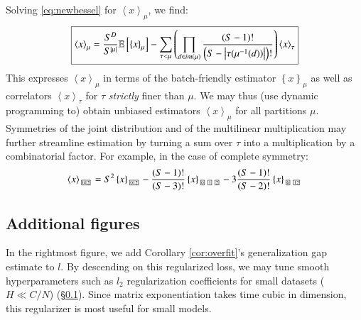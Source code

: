 \documentclass[anon,12pt]{colt2021} %
\newcommand{\wrap}[1]{\left(#1\right)}
\newcommand{\wang}[1]{\left\langle#1\right\rangle}
\newcommand{\wabs}[1]{\left|#1\right|}
\newcommand{\wurl}[1]{\left\{#1\right\}}
\newcommand{\partitionbox}[1]{
    \text{
        \fboxsep=0.5pt
        \tiny
        \fbox{#1}
    }
}
\newcommand{\expct}[1]{\mathbb{E}\left[#1\right]}
\begin{document}
        Solving \ref{eq:newbessel} for $\wang{x}_\mu$, we find:
        \begin{equation*}
            \text{\fbox{$
            \wang{x}_\mu
            =
            \frac{S^D}{S^{\wabs{\mu}}}
            \expct{
                \wurl{x}_\mu
            }
            -
            \sum_{\tau < \mu} \wrap{
                \prod_{d\in im(\mu)}
                \frac{\wrap{S-1}!}{\wrap{S-\wabs{\tau(\mu^{-1}(d))}}!}
            }
            \wang{x}_\tau
            $}}
        \end{equation*}
        This expresses $\wang{x}_\mu$ in terms of the batch-friendly estimator
        $\wurl{x}_\mu$ as well as correlators $\wang{x}_\tau$ for $\tau$
        \emph{strictly} finer than $\mu$.  We may thus (use dynamic programming
        to) obtain unbiased estimators $\wang{x}_\mu$ for all partitions $\mu$.
        Symmetries of the joint distribution and of the multilinear
        multiplication may further streamline estimation by turning a sum over
        $\tau$ into a multiplication by a combinatorial factor.  For example,
        in the case of complete symmetry:
        $$
            \wang{x}_{\partitionbox{012}}
            =
            S^2
            \wurl{x}_{\partitionbox{012}}
            -
            \frac{(S-1)!}{(S-3)!}
            \wurl{x}_{\partitionbox{0}\partitionbox{1}\partitionbox{2}}
            -
            3\frac{(S-1)!}{(S-2)!}
            \wurl{x}_{\partitionbox{0}\partitionbox{12}}
        $$

    \subsection{Additional figures}                                 \label{appendix:figures}

        In the rightmost figure, 
        we add Corollary \ref{cor:overfit}'s
            generalization gap estimate to $l$.  By descending on this
            regularized loss, we may tune smooth hyperparameters such as $l_2$
            regularization coefficients for small datasets ($H \ll C/N$)
            (\S\ref{appendix:figures}).  Since matrix exponentiation takes time
            cubic in dimension, this regularizer is most useful for small
            models.
\end{document}
